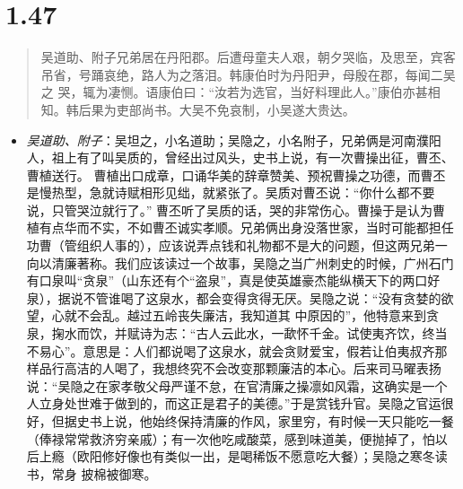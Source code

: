 \documentclass[]{book}
\providecommand{\tightlist}{%
  \setlength{\itemsep}{0pt}\setlength{\parskip}{0pt}}
\begin{document}
\section{1.47}\label{section-46}

\begin{quote}
吴道助、附子兄弟居在丹阳郡。后遭母童夫人艰，朝夕哭临，及思至，宾客吊省，号踊哀绝，路人为之落泪。韩康伯时为丹阳尹，母殷在郡，每闻二吴之
哭，辄为凄恻。语康伯曰：``汝若为选官，当好料理此人。''康伯亦甚相知。韩后果为吏部尚书。大吴不免哀制，小吴遂大贵达。
\end{quote}

\begin{itemize}
\tightlist
\item
  \emph{吴道助、附子}：吴坦之，小名道助；吴隐之，小名附子，兄弟俩是河南濮阳人，祖上有了叫吴质的，曾经出过风头，史书上说，有一次曹操出征，曹丕、曹植送行。
  曹植出口成章，口诵华美的辞章赞美、预祝曹操之功德，而曹丕是慢热型，急就诗赋相形见绌，就紧张了。吴质对曹丕说：``你什么都不要说，只管哭泣就行了。''
  曹丕听了吴质的话，哭的非常伤心。曹操于是认为曹植有点华而不实，不如曹丕诚实孝顺。兄弟俩出身没落世家，当时可能都担任功曹（管组织人事的），应该说弄点钱和礼物都不是大的问题，但这两兄弟一向以清廉著称。我们应该读过一个故事，吴隐之当广州刺史的时候，广州石门有口泉叫``贪泉''（山东还有个``盗泉''，真是使英雄豪杰能纵横天下的两口好泉），据说不管谁喝了这泉水，都会变得贪得无厌。吴隐之说：``没有贪婪的欲望，心就不会乱。越过五岭丧失廉洁，我知道其
  中原因的''，他特意来到贪泉，掬水而饮，并赋诗为志：``古人云此水，一歃怀千金。试使夷齐饮，终当不易心''。意思是：人们都说喝了这泉水，就会贪财爱宝，假若让伯夷叔齐那样品行高洁的人喝了，我想终究不会改变那颗廉洁的本心。后来司马曜表扬说：``吴隐之在家孝敬父母严谨不怠，在官清廉之操凛如风霜，这确实是一个人立身处世难于做到的，而这正是君子的美德。''于是赏钱升官。吴隐之官运很好，但据史书上说，他始终保持清廉的作风，家里穷，有时候一天只能吃一餐
  （俸禄常常救济穷亲戚）；有一次他吃咸酸菜，感到味道美，便抛掉了，怕以后上瘾（欧阳修好像也有类似一出，是喝稀饭不愿意吃大餐）；吴隐之寒冬读书，常身
  披棉被御寒。
\end{itemize}
\end{document}

